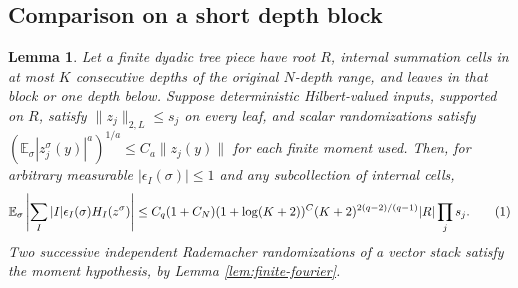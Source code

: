 \documentclass[11pt]{article}
\newtheorem{lemma}[theorem]{Lemma}
\theoremstyle{definition}
\newcommand{\E}{\mathbb E}
\newcommand{\eqtag}[1]{\refstepcounter{equation}\tag{\theequation}\label{#1}}
\numberwithin{equation}{section}
\begin{document}
\subsection*{Comparison on a short depth block}
\begin{lemma}\label{lem:shortblock}
Let a finite dyadic tree piece have root $R$, internal summation cells in at most $K$ consecutive depths of the original $N$-depth range, and leaves in that block or one depth below. Suppose deterministic Hilbert-valued inputs, supported on $R$, satisfy $\|z_j\|_{2,L}\le s_j$ on every leaf, and scalar randomizations satisfy $(\E_\sigma|z_j^\sigma(y)|^a)^{1/a}\le C_a\|z_j(y)\|$ for each finite moment used. Then, for arbitrary measurable $|\epsilon_I(\sigma)|\le1$ and any subcollection of internal cells,
\[
 \E_\sigma\left|\sum_I|I|\epsilon_I(\sigma)H_I(z^\sigma)\right|
 \le C_q(1+C_N)(1+\log(K+2))^C(K+2)^{2(q-2)/(q-1)}|R|\prod_js_j.
 \eqtag{eq:shortblock}
\]
Two successive independent Rademacher randomizations of a vector stack satisfy the moment hypothesis, by Lemma \ref{lem:finite-fourier}.
\end{lemma}
\end{document}
